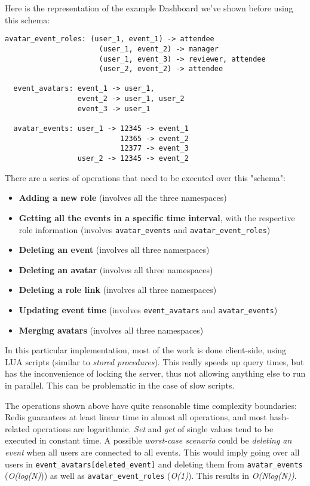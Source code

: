 Here is the representation of the example Dashboard we've shown before using this schema:
\begin{lstlisting}[caption=Example Dashboard Data in Redis]
  avatar_event_roles: (user_1, event_1) -> attendee
                      (user_1, event_2) -> manager
                      (user_1, event_3) -> reviewer, attendee
                      (user_2, event_2) -> attendee

  event_avatars: event_1 -> user_1,
                 event_2 -> user_1, user_2
                 event_3 -> user_1

  avatar_events: user_1 -> 12345 -> event_1
                           12365 -> event_2
                           12377 -> event_3
                 user_2 -> 12345 -> event_2
\end{lstlisting}

There are a series of operations that need to be executed over this "schema":

\begin{itemize}
  \item \textbf{Adding a new role} (involves all the three namespaces)
  \item \textbf{Getting all the events in a specific time interval}, with the respective role information (involves \texttt{avatar\_events} and \texttt{avatar\_event\_roles})
  \item \textbf{Deleting an event} (involves all three namespaces)
  \item \textbf{Deleting an avatar} (involves all three namespaces)
  \item \textbf{Deleting a role link} (involves all three namespaces)
  \item \textbf{Updating event time} (involves \texttt{event\_avatars} and \texttt{avatar\_events})
  \item \textbf{Merging avatars} (involves all three namespaces)
\end{itemize}
In this particular implementation, most of the work is done client-side, using LUA scripts (similar to \textit{stored procedures}). This really speeds up query times, but has the inconvenience of locking the server, thus not allowing anything else to run in parallel. This can be problematic in the case of slow scripts.

The operations shown above have quite reasonable time complexity boundaries: Redis guarantees at least linear time in almost all operations, and most hash-related operations are logarithmic. \textit{Set} and \textit{get} of single values tend to be executed in constant time. A possible \textit{worst-case scenario} could be \textit{deleting an event} when all users are connected to all events. This would imply going over all users in \texttt{event\_avatars[deleted\_event]} and deleting them from \texttt{avatar\_events} (\textit{O(log(N)})) as well as \texttt{avatar\_event\_roles} (\textit{O(1)}). This results in \textit{O(Nlog(N))}.

